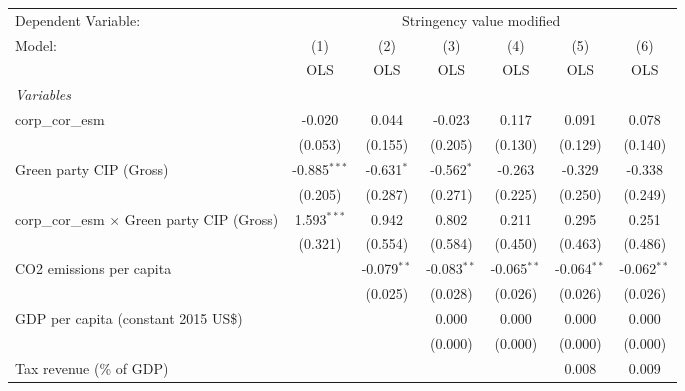 
\begingroup
\centering
\begin{tabular}{lcccccc}
   \toprule
   Dependent Variable: & \multicolumn{6}{c}{Stringency value modified}\\
   Model:                                             & (1)            & (2)           & (3)           & (4)           & (5)           & (6)\\  
                                                      &  OLS           & OLS           & OLS           & OLS           & OLS           & OLS\\  
   \midrule
   \emph{Variables}\\
   corp\_cor\_esm                                     & -0.020         & 0.044         & -0.023        & 0.117         & 0.091         & 0.078\\   
                                                      & (0.053)        & (0.155)       & (0.205)       & (0.130)       & (0.129)       & (0.140)\\   
   Green party CIP (Gross)                            & -0.885$^{***}$ & -0.631$^{*}$  & -0.562$^{*}$  & -0.263        & -0.329        & -0.338\\   
                                                      & (0.205)        & (0.287)       & (0.271)       & (0.225)       & (0.250)       & (0.249)\\   
   corp\_cor\_esm $\times$ Green party CIP (Gross)    & 1.593$^{***}$  & 0.942         & 0.802         & 0.211         & 0.295         & 0.251\\   
                                                      & (0.321)        & (0.554)       & (0.584)       & (0.450)       & (0.463)       & (0.486)\\   
   CO2 emissions per capita                           &                & -0.079$^{**}$ & -0.083$^{**}$ & -0.065$^{**}$ & -0.064$^{**}$ & -0.062$^{**}$\\   
                                                      &                & (0.025)       & (0.028)       & (0.026)       & (0.026)       & (0.026)\\   
   GDP per capita (constant 2015 US\$)                &                &               & 0.000         & 0.000         & 0.000         & 0.000\\   
                                                      &                &               & (0.000)       & (0.000)       & (0.000)       & (0.000)\\   
   Tax revenue (\% of GDP)                            &                &               &               &               & 0.008         & 0.009\\   

\end{tabular}
